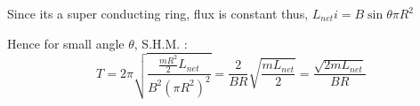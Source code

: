 \documentclass[11pt,a4paper]{scrartcl}
\begin{document}
\begin{solution}



Since its a super conducting ring, flux is constant thus, $\boxed{L_{net} i = B \sin \theta \pi R^2}$ \\
\vspace{0.4mm}

Hence for small angle $\theta$, S.H.M. : \\

\[T= 2 \pi \sqrt{\frac{\frac{mR^2}{2}L_{net}}{B^2 (\pi R^2)^2}} = \frac{2}{BR} \sqrt{\frac{m L_{net}}{2}} = \frac{\sqrt{2m L_{net}}}{BR}\]



\end{solution}
\vspace{10mm}%
\end{document}

